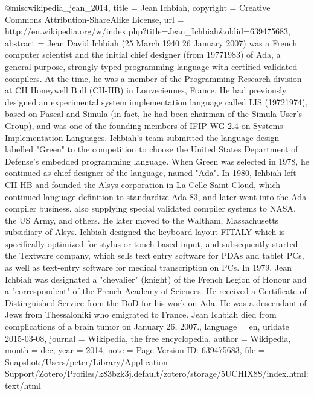 {@misc{wikipedia_jean_2014,
  title     = {Jean {Ichbiah}},
  copyright = {Creative Commons Attribution-ShareAlike License},
  url       = {http://en.wikipedia.org/w/index.php?title=Jean_Ichbiah&oldid=639475683},
  abstract  = {Jean David Ichbiah (25 March 1940 {\textendash} 26 January 2007) was a French computer scientist and the initial chief designer (from 1977{\textendash}1983) of Ada, a general-purpose, strongly typed programming language with certified validated compilers. At the time, he was a member of the Programming Research division at CII Honeywell Bull (CII-HB) in Louveciennes, France. He had previously designed an experimental system implementation language called LIS (1972{\textendash}1974), based on Pascal and Simula (in fact, he had been chairman of the Simula User's Group), and was one of the founding members of IFIP WG 2.4 on Systems Implementation Languages.
Ichbiah's team submitted the language design labelled "Green" to the competition to choose the United States Department of Defense's embedded programming language. When Green was selected in 1978, he continued as chief designer of the language, named "Ada". In 1980, Ichbiah left CII-HB and founded the Alsys corporation in La Celle-Saint-Cloud, which continued language definition to standardize Ada 83, and later went into the Ada compiler business, also supplying special validated compiler systems to NASA, the US Army, and others. He later moved to the Waltham, Massachusetts subsidiary of Alsys.
Ichbiah designed the keyboard layout FITALY which is specifically optimized for stylus or touch-based input, and subsequently started the Textware company, which sells text entry software for PDAs and tablet PCs, as well as text-entry software for medical transcription on PCs.
In 1979, Jean Ichbiah was designated a "chevalier" (knight) of the French Legion of Honour and a "correspondent" of the French Academy of Sciences. He received a Certificate of Distinguished Service from the DoD for his work on Ada.
He was a descendant of Jews from Thessaloniki who emigrated to France. Jean Ichbiah died from complications of a brain tumor on January 26, 2007.},
  language  = {en},
  urldate   = {2015-03-08},
  journal   = {Wikipedia, the free encyclopedia},
  author    = {{Wikipedia}},
  month     = dec,
  year      = {2014},
  note      = {Page Version ID: 639475683},
  file      = {Snapshot:/Users/peter/Library/Application Support/Zotero/Profiles/k83bzk3j.default/zotero/storage/5UCHIX8S/index.html:text/html}
}

}
